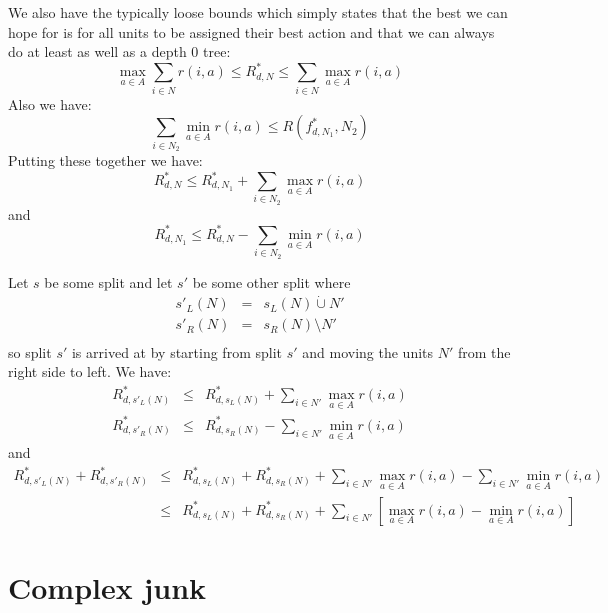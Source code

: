 \documentclass{article}
\begin{document}
We also have the typically loose bounds which simply states that
the best we can hope for is for all units to be assigned their best
action and that we can always do at least as well as a depth 0 tree:
\begin{equation}
  \label{eq:loosebound}
\max_{a \in A} \sum_{i \in N}  r(i,a) \leq  R^{*}_{d,N} \leq \sum_{i \in N} \max_{a \in A} r(i,a) 
\end{equation}
Also we have:
\begin{equation}
  \label{eq:llb}
\sum_{i \in N_{2}} \min_{a \in A} r(i,a) \leq R(f^{*}_{d,N_{1}},N_{2})  
\end{equation}
Putting these together we have:
\begin{equation}
  \label{eq:ub}
R^{*}_{d,N}   \leq  R^{*}_{d,N_{1}} + \sum_{i \in N_{2}} \max_{a \in A} r(i,a) 
\end{equation}
and
\begin{equation}
  \label{eq:lb}
  R^{*}_{d,N_{1}}   \leq R^{*}_{d,N} -  \sum_{i \in N_{2}} \min_{a \in A} r(i,a)
\end{equation}

Let $s$ be some split and let $s'$ be some other split where
\begin{eqnarray}
  \label{eq:splits}
  s'_{L}(N) & = & s_{L}(N) \dot\cup N' \\
  s'_{R}(N) & = & s_{R}(N) \setminus N' \\
\end{eqnarray}
so split $s'$ is arrived at by starting from split $s'$ and moving the
units $N'$ from the right side to left.
We have:
\begin{eqnarray}
  \label{eq:splitsub}
  R^{*}_{d,s'_{L}(N)} & \leq & R^{*}_{d,s_{L}(N)} +  \sum_{i \in N'}
                               \max_{a \in A} r(i,a) \\
  R^{*}_{d,s'_{R}(N)} & \leq & R^{*}_{d,s_{R}(N)} - \sum_{i \in N'} \min_{a \in A} r(i,a)
\end{eqnarray}
and
\begin{eqnarray*}
  \label{eq:sumub}
  R^{*}_{d,s'_{L}(N)} +  R^{*}_{d,s'_{R}(N)}
  & \leq
  &  R^{*}_{d,s_{L}(N)}
    +  R^{*}_{d,s_{R}(N)}
    +  \sum_{i \in N'} \max_{a \in A} r(i,a)
    -  \sum_{i \in N'} \min_{a \in A} r(i,a) \\
  & \leq
  & R^{*}_{d,s_{L}(N)}
    +  R^{*}_{d,s_{R}(N)}
    +  \sum_{i \in N'} \left[ \max_{a \in A} r(i,a)- \min_{a \in A}
    r(i,a) \right]
\end{eqnarray*}

\section{Complex junk}
\label{sec:junk}
\end{document}
